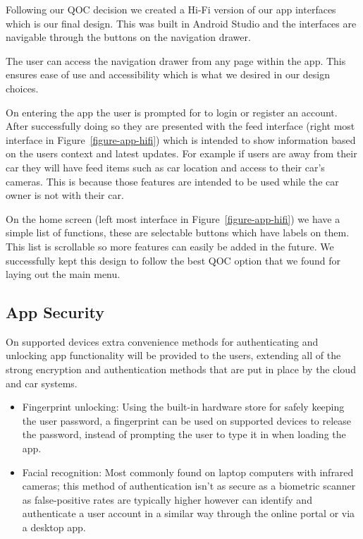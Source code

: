 \documentclass{article}
\begin{document}
\pagebreak

\noindent Following our QOC decision we created a Hi-Fi version of our app interfaces which is our final design. This was built in Android Studio and the interfaces are navigable through the buttons on the navigation drawer.

The user can access the navigation drawer from any page within the app. This ensures ease of use and accessibility which is what we desired in our design choices.

On entering the app the user is prompted for to login or register an account. After successfully doing so they are presented with the feed interface (right most interface in Figure~\ref{figure-app-hifi}) which is intended to show information based on the users context and latest updates. For example if users are away from their car they will have feed items such as car location and access to their car's cameras. This is because those features are intended to be used while the car owner is not with their car.

On the home screen (left most interface in Figure~\ref{figure-app-hifi}) we have a simple list of functions, these are selectable buttons which have labels on them. This list is scrollable so more features can easily be added in the future. We successfully kept this design to follow the best QOC option that we found for laying out the main menu.

\subsection{App Security}\label{ssec:app-security}
On supported devices extra convenience methods for authenticating and unlocking app functionality will be provided to the users, extending all of the strong encryption and authentication methods that are put in place by the cloud and car systems.
\begin{itemize}
  \item Fingerprint unlocking: Using the built-in hardware store for safely keeping the user password, a fingerprint can be used on supported devices to release the password, instead of prompting the user to type it in when loading the app.
  \item Facial recognition: Most commonly found on laptop computers with infrared cameras; this method of authentication isn't as secure as a biometric scanner as false-positive rates are typically higher however can identify and authenticate a user account in a similar way through the online portal or via a desktop app.
\end{itemize}
\end{document}
